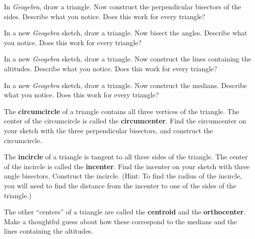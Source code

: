 \documentclass[nooutcomes]{ximera}
\begin{document}
\begin{problem} 
In \textsl{Geogebra}, draw a triangle. Now construct the perpendicular bisectors of
the sides.  Describe what you notice.  Does this work for every triangle?
\end{problem}

\begin{problem}
In a new \textsl{Geogebra} sketch, draw a triangle. Now bisect the angles.  Describe what you notice.  Does this work for every
triangle?
\end{problem}

\begin{problem}
In a new \textsl{Geogebra} sketch, draw a triangle. Now construct the lines containing the altitudes.  Describe what you notice.  
Does this work for every triangle?
\end{problem}

\begin{problem}
In a new \textsl{Geogebra} sketch, draw a triangle. Now construct the medians.  Describe what you notice.  Does this work for every triangle?
\end{problem}

\begin{problem}
The \textbf{circumcircle} of a triangle contains all three vertices of the triangle.  The center of the circumcircle is called the \textbf{circumcenter}.  Find the circumcenter on your sketch with the three perpendicular bisectors, and construct the circumcircle.  
\end{problem}

\begin{problem}
The \textbf{incircle} of a triangle is tangent to all three sides of the triangle.  The center of the incircle is called the \textbf{incenter}.  
Find the incenter on your sketch with three angle bisectors. Construct the incircle.  (Hint:  To find the radius of the incircle, you will need to find the distance from the incenter to one of the sides of the triangle.)  
\end{problem}

\begin{problem}
The other ``centers'' of a triangle are called the \textbf{centroid} and the \textbf{orthocenter}.  Make a thoughtful guess about how these correspond to the medians and the lines containing the altitudes.  
\end{problem}
\end{document}
